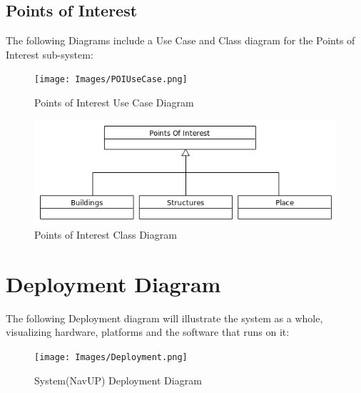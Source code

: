 \documentclass{article}
\begin{document}
	\subsection{Points of Interest}
	The following Diagrams include a Use Case and Class diagram for the Points of Interest sub-system:
	\FloatBarrier	
	\begin{figure}[h]
		\caption{Points of Interest Use Case Diagram}
  		\texttt{[image: Images/POIUseCase.png]}
	\end{figure}
	\begin{figure}[h]
		\caption{Points of Interest Class Diagram}
  		\includegraphics[width=\textwidth]{Images/POIClass.png}
	\end{figure}
	\FloatBarrier
	\clearpage	
\section{Deployment Diagram}
The following Deployment diagram will illustrate the system as a whole, visualizing hardware, platforms and the software that runs on it:
	\FloatBarrier	
	\begin{figure}[h]
		\caption{System(NavUP) Deployment Diagram}
  		\texttt{[image: Images/Deployment.png]}
	\end{figure}
	\FloatBarrier	
	\clearpage
\end{document}
